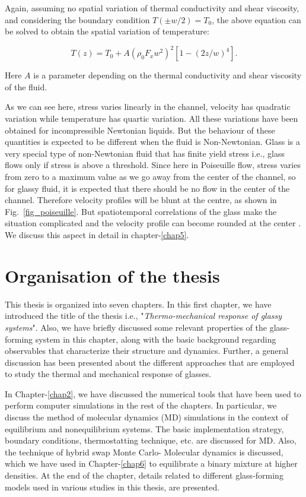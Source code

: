     Again, assuming no spatial variation of thermal conductivity and shear viscosity, and considering the boundary condition $T(\pm w/2) = T_0$, the above equation can be solved to obtain the spatial variation of temperature:

    \begin{equation}
    T(z)=T_0 + A(\rho_0{F_x}w^2)^2[1-(2z/w)^4].
    \end{equation}

    Here $A$ is a parameter depending on the thermal conductivity and shear viscosity of the fluid.
    
    As we can see here, stress varies linearly in the channel, velocity has quadratic variation while temperature has quartic variation. All these variations have been obtained for incompressible Newtonian liquids. But the behaviour of these quantities is expected to be different when the fluid is Non-Newtonian. Glass is a very special type of non-Newtonian fluid that has finite yield stress i.e., glass flows only if stress is above a threshold. Since here in Poiseuille flow, stress varies from zero to a maximum value as we go away from the center of the channel, so for glassy fluid, it is expected that there should be no flow in the center of the channel. Therefore velocity profiles will be blunt at the centre, as shown in Fig.~\ref{fig_poiseuille}. But spatiotemporal correlations of the glass make the situation complicated and the velocity profile can become rounded at the center \cite{goyon2008spatial}. We discuss this aspect in detail in chapter-\ref{chap5}. 
    
\section{Organisation of the thesis}
This thesis is organized into seven chapters. In this first chapter, we have introduced the title of the thesis i.e., "{\em Thermo-mechanical response of glassy systems}". Also, we have briefly discussed some relevant properties of the glass-forming system in this chapter, along with the basic background regarding observables that characterize their structure and dynamics. Further, a general discussion has been presented about the different approaches that are employed to study the thermal and mechanical response of glasses.

In Chapter-\ref{chap2}, we have discussed the numerical tools that have been used to perform computer simulations in the rest of the chapters. In particular, we discuss the method of molecular dynamics (MD) simulations in the context of equilibrium and nonequilibrium systems. The basic implementation strategy, boundary conditions, thermostatting technique, etc. are discussed for MD. Also, the technique of hybrid swap Monte Carlo- Molecular dynamics is discussed, which we have used in Chapter-\ref{chap6} to equilibrate a binary mixture at higher densities. At the end of the chapter, details related to different glass-forming models used in various studies in this thesis, are presented.

